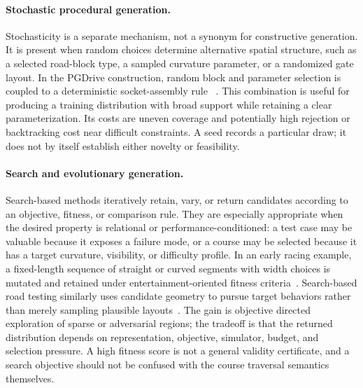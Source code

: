 \paragraph{Stochastic procedural generation.}
Stochasticity is a separate mechanism, not a synonym for constructive
generation.  It is present when random choices determine alternative spatial
structure, such as a selected road-block type, a sampled curvature parameter,
or a randomized gate layout.  In the PGDrive construction, random block and
parameter selection is coupled to a deterministic socket-assembly rule
~\cite{Li2020ImprovingGeneralization}.  This combination is useful for
producing a training distribution with broad support while retaining a clear
parameterization.  Its costs are uneven coverage and potentially high rejection
or backtracking cost near difficult constraints.  A seed records a particular
draw; it does not by itself establish either novelty or feasibility.

\paragraph{Search and evolutionary generation.}
Search-based methods iteratively retain, vary, or return candidates according
to an objective, fitness, or comparison rule.  They are especially appropriate
when the desired property is relational or performance-conditioned: a test case
may be valuable because it exposes a failure mode, or a course may be selected
because it has a target curvature, visibility, or difficulty profile.  In an
early racing example, a fixed-length sequence of straight or curved segments
with width choices is mutated and retained under entertainment-oriented fitness
criteria~\cite{Togelius2006MakingRacing}.  Search-based road testing similarly
uses candidate geometry to pursue target behaviors rather than merely sampling
plausible layouts~\cite{Blattner2024DiversityGuided}.  The gain is objective
directed exploration of sparse or adversarial regions; the tradeoff is that the
returned distribution depends on representation, objective, simulator,
budget, and selection pressure.  A high fitness score is not a general validity
certificate, and a search objective should not be confused with the course
traversal semantics themselves.

